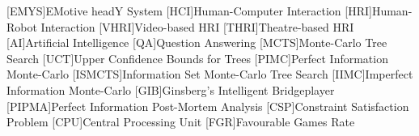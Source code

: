 \renewcommand{\listofacronymsname}{Glossary}
\listofacronyms

\begin{acronym}[PIPMA]
[EMYS]{EMotive headY System}
[HCI]{Human-Computer Interaction}
[HRI]{Human-Robot Interaction}
[VHRI]{Video-based HRI}
[THRI]{Theatre-based HRI}
[AI]{Artificial Intelligence}
[QA]{Question Answering}
[MCTS]{Monte-Carlo Tree Search}
[UCT]{Upper Confidence Bounds for Trees}
[PIMC]{Perfect Information Monte-Carlo}
[ISMCTS]{Information Set Monte-Carlo Tree Search}
[IIMC]{Imperfect Information Monte-Carlo}
[GIB]{Ginsberg's Intelligent Bridgeplayer}
[PIPMA]{Perfect Information Post-Mortem Analysis}
[CSP]{Constraint Satisfaction Problem}
[CPU]{Central Processing Unit}
[FGR]{Favourable Games Rate}
\end{acronym}

\cleardoublepage

